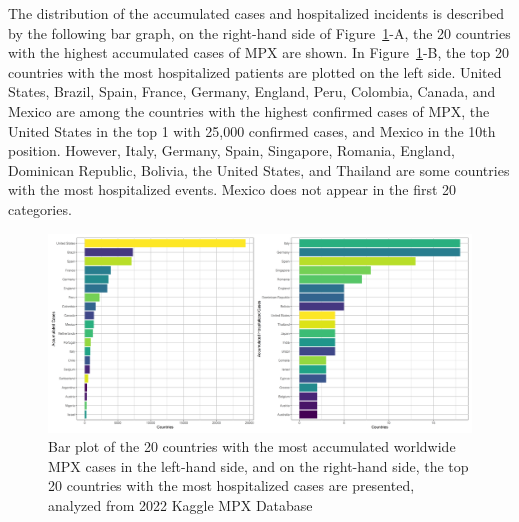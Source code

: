 \documentclass[conference]{IEEEtran}
\begin{document}
The distribution of the accumulated cases and hospitalized incidents is described by the following bar graph, on the right-hand side of Figure~\ref{fig:Top20Barplot}-A, the 20 countries with the highest accumulated cases of MPX are shown. In Figure~\ref{fig:Top20Barplot}-B, the top 20 countries with the most hospitalized patients are plotted on the left side. United States, Brazil, Spain, France, Germany, England, Peru, Colombia, Canada, and Mexico are among the countries with the highest confirmed cases of MPX, the United States in the top 1 with 25,000 confirmed cases, and Mexico in the 10th position. However, Italy, Germany, Spain, Singapore, Romania, England, Dominican Republic, Bolivia, the United States, and Thailand are some countries with the most hospitalized events. Mexico does not appear in the first 20 categories.
\begin{figure}[H]
    \centering
    \includegraphics[width = 8 cm]{Top20Barplot.png}
    \caption{Bar plot of the 20 countries with the most accumulated worldwide MPX cases in the left-hand side, and on the right-hand side, the top 20 countries with the most hospitalized cases are presented, analyzed from 2022 Kaggle MPX Database~\cite{Contractor2022}}
    \label{fig:Top20Barplot}
\end{figure}
\end{document}
